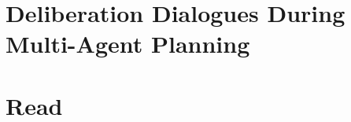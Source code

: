 \documentclass[a4paper]{article}
\begin{document}
\section{Deliberation Dialogues During Multi-Agent 
Planning\cite{dunin-keplicz2011}}

\section{Read}
\cite{atkinson2005}
\cite{dunin-keplicz2011}
\cite{prakken2006}
\cite{mcburney2007}
\cite{mcburney2009}
\cite{medellin2012}
\cite{pollock1995}
\cite{prakken2009}
\cite{silver2005}
\cite{standley2010}
\cite{bench-capon2007}
\cite{vaneemeren2014}
\cite{verheij2016}

\nocite{*}


\end{document}
